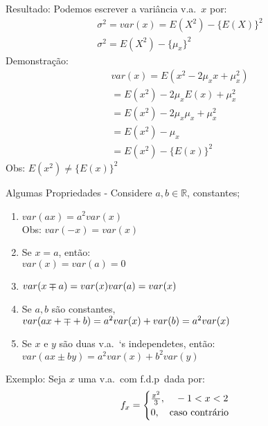 \documentclass[11pt,a4paper]{article}
\begin{document}
Resultado: Podemos escrever a variância v.a.\ $x$ por: 
\begin{align}
  \sigma^2 =var(x)=E(X^2)-\{E(X)\}^2\\
  \sigma^2 =E(X^2)-\{\mu_x\}^2
\end{align}
Demonstração: 
\begin{align}
  var(x)=E(x^2-2\mu_{x}x+\mu_{x}^2)\\
  =E(x^2)-2\mu_{x}E(x)+\mu_{x}^2\\
  =E(x^2)-2\mu_{x}\mu_{x}+\mu_{x}^2\\
  =E(x^2)-\mu_{x}\\
  =E(x^2)-\{E(x)\}^2
\end{align}
Obs: $E(x^2) \neq \{E(x)\}^2$

Algumas Propriedades
- Considere $a,b \in \mathbb{R}$, constantes;
\begin{enumerate}[label=(\alph*)]
  \item $var(ax)=a^2var(x)$
    \\Obs: $var(-x)=var(x)$
  \item Se $x=a$, então:\\
    $var(x)=var(a)=0$
  \item $var(x \mp a)=var(x)var(a)\\ =var(x)$
  \item Se $a,b$ são constantes,\\
    $var(ax+\mp+b)=a^2 var(x)+var(b)\\
    =a^2 var(x)$
  \item Se $x$ e $y$ são duas v.a.\ `s independetes, então: 
    $var(ax \pm by)=a^2 var(x)+ b^2 var(y)$
\end{enumerate}
Exemplo: Seja $x$ uma v.a.\ com f.d.p\ dada por: 
\begin{align}
  f_{x}=
  \begin{cases}
    \frac{x^2}{3}, \text{\quad} -1<x<2\\
    0, \text{\quad caso contrário}
  \end{cases}
\end{align}
\end{document}
